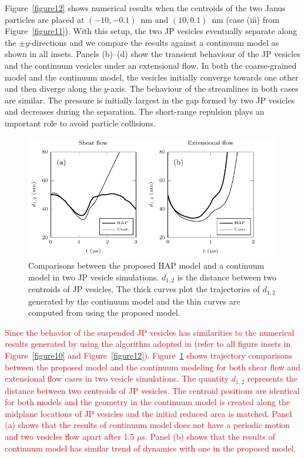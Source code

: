 \documentclass[lineno]{jfm}
\newcommand{\ReviewerOne}[1]{\textcolor{red}{#1}}
\begin{document}
Figure~\ref{figure12} shows numerical results when the centroids of the
two Janus particles are placed at $(-10,-0.1)$~nm and $(10,0.1)$~nm
(case (iii) from Figure~\ref{figure11}). With this setup, the two JP
vesicles eventually separate along the $\pm y$-directions and we compare
the results against a continuum model as shown in all insets. Panels
(b)--(d) show the transient behaviour of the JP vesicles and the
continuum vesicles under an extensional flow. In both the coarse-grained
model and the continuum model, the vesicles initially converge towards
one other and then diverge along the $y$-axis. The behaviour of the
streamlines in both cases are similar. The pressure is initially largest
in the gap formed by two JP vesicles and decreases during the
separation. The short-range repulsion plays an important role to avoid
particle collisions.




\begin{figure}
  \centering
  \includegraphics[width=\textwidth]{Figure13_Wrapper.pdf}
  \caption{\label{figure13} Comparisons between the proposed HAP model and a continuum model in 
  two JP vesicle simulations. 
  $d_{1,2}$ is the distance between two centroids of JP vesicles. The thick curves plot the trajectories
  of $d_{1,2}$ generated by the continuum model and the thin curves are computed from using
  the proposed model.}
\end{figure}


\ReviewerOne{Since the behavior of the suspended JP vesicles has similarities to the numerical 
results generated by using the algorithm adopted in \cite{qua-vee-you2019} (refer to all figure
insets in Figure~\ref{figure10} and Figure~\ref{figure12}). Figure~\ref{figure13} shows 
trajectory comparisons between the proposed model and the continuum modeling for both 
shear flow and extensional flow cases in two vesicle simulations. The quantity $d_{1,2}$
represents the distance between two centroids of JP vesicles. The centroid positions are 
identical for both models and the geometry in the continuum model is created along the 
midplane locations of JP vesicles and the initial reduced area is matched. Panel (a) shows that 
the results of continuum model does not have a periodic motion and two vesicles flow apart 
after 1.5 $\mu$s. Panel (b) shows that the results of continuum model has similar trend of
dynamics with one in the proposed model.}
\end{document}
